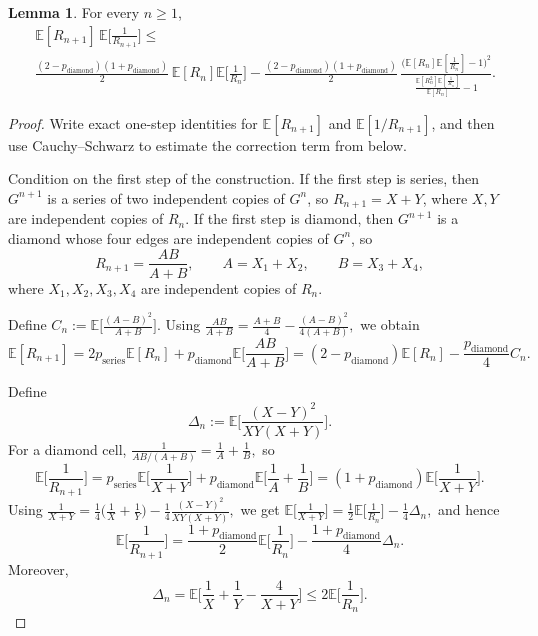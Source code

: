 \documentclass{article}
\theoremstyle{plain}
\theoremstyle{definition}
\newtheorem{lemma}[theorem]{Lemma}
\begin{document}
\begin{lemma}\label{lem:logistic_product}
For every $n\ge 1$,
\begin{align*}
&\mathbb E[R_{n+1}]\,\mathbb E\Big[\frac{1}{R_{n+1}}\Big]
\le \\
&\frac{(2-p_{\mathrm{diamond}})(1+p_{\mathrm{diamond}})}{2}\,
\mathbb E[R_n]\mathbb E\Big[\frac{1}{R_n}\Big]
-
\frac{(2-p_{\mathrm{diamond}})(1+p_{\mathrm{diamond}})}{2}\,
\frac{\big(\mathbb E[R_n]\mathbb E[\frac{1}{R_n}]-1\big)^2}
{\frac{\mathbb E[R_n^2]\mathbb E[\frac{1}{R_n}]}{\mathbb E[R_n]}-1}.
\end{align*}
\end{lemma}

\begin{proof}
 
Write exact one-step identities for $\mathbb E[R_{n+1}]$ and $\mathbb E[1/R_{n+1}]$, and then use Cauchy--Schwarz to estimate the correction term from below.

Condition on the first step of the construction.
If the first step is series, then $G^{n+1}$ is a series of two independent copies of $G^n$, so $R_{n+1}=X+Y$, where $X,Y$ are independent copies of $R_n$.
If the first step is diamond, then $G^{n+1}$ is a diamond whose four edges are independent copies of $G^n$, so
\[
R_{n+1}=\frac{AB}{A+B},
\qquad
A=X_1+X_2,
\qquad
B=X_3+X_4,
\]
where $X_1,X_2,X_3,X_4$ are independent copies of $R_n$.

Define
$
C_n:=\mathbb E\Big[\frac{(A-B)^2}{A+B}\Big].
$
Using
$
\frac{AB}{A+B}=\frac{A+B}{4}-\frac{(A-B)^2}{4(A+B)},
$
we obtain
\[
\mathbb E[R_{n+1}]
=
2p_{\mathrm{series}}\mathbb E[R_n]
+
p_{\mathrm{diamond}}\mathbb E\Big[\frac{AB}{A+B}\Big]
=
(2-p_{\mathrm{diamond}})\mathbb E[R_n]-\frac{p_{\mathrm{diamond}}}{4}C_n.
\]

Define
\[
\Delta_n:=\mathbb E\Big[\frac{(X-Y)^2}{XY(X+Y)}\Big].
\]
For a diamond cell,
$
\frac{1}{AB/(A+B)}=\frac{1}{A}+\frac{1}{B},
$
so
\[
\mathbb E\Big[\frac{1}{R_{n+1}}\Big]
=
p_{\mathrm{series}}\mathbb E\Big[\frac{1}{X+Y}\Big]
+
p_{\mathrm{diamond}}\mathbb E\Big[\frac{1}{A}+\frac{1}{B}\Big]
=
(1+p_{\mathrm{diamond}})\mathbb E\Big[\frac{1}{X+Y}\Big].
\]
Using
$
\frac{1}{X+Y}
=
\frac{1}{4}\Big(\frac{1}{X}+\frac{1}{Y}\Big)
-
\frac{1}{4}\frac{(X-Y)^2}{XY(X+Y)},
$
we get
$
\mathbb E\Big[\frac{1}{X+Y}\Big]
=
\frac{1}{2}\mathbb E\Big[\frac{1}{R_n}\Big]-\frac{1}{4}\Delta_n,
$
and hence
\[
\mathbb E\Big[\frac{1}{R_{n+1}}\Big]
=
\frac{1+p_{\mathrm{diamond}}}{2}\mathbb E\Big[\frac{1}{R_n}\Big]
-\frac{1+p_{\mathrm{diamond}}}{4}\Delta_n.
\]
Moreover,
\[
\Delta_n
=
\mathbb E\Big[\frac{1}{X}+\frac{1}{Y}-\frac{4}{X+Y}\Big]
\le
2\mathbb E\Big[\frac{1}{R_n}\Big].
\]


\end{proof}
\end{document}
